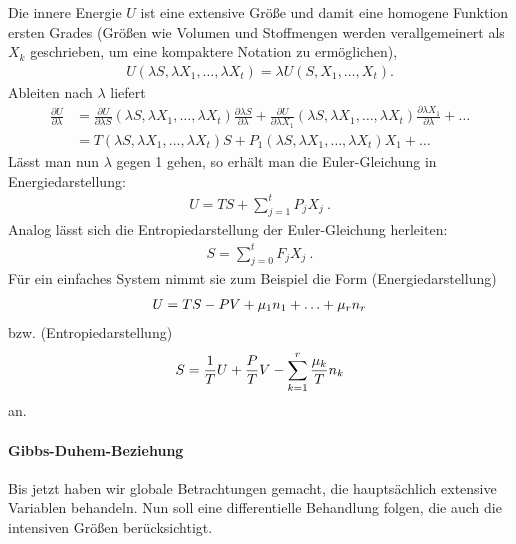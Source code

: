Die innere Energie $U$ ist eine extensive Größe und damit eine homogene Funktion ersten Grades (Größen wie Volumen und Stoffmengen werden verallgemeinert als $X_k$ geschrieben, um eine kompaktere Notation zu ermöglichen),
\begin{align*}
    U(\lambda S,\lambda X_1,\ldots,\lambda X_t) = \lambda U(S,X_1,\ldots,X_t).
\end{align*}
Ableiten nach $\lambda$ liefert
\begin{align*}
    \frac{\partial U}{\partial\lambda} & = \frac{\partial U}{\partial\lambda S}(\lambda S,\lambda X_1,\ldots,\lambda X_t) \frac{\partial\lambda S}{\partial\lambda} + \frac{\partial U}{\partial\lambda X_1}(\lambda S,\lambda X_1,\ldots,\lambda X_t) \frac{\partial\lambda X_1}{\partial\lambda} + \ldots \\
                                       & = T(\lambda S,\lambda X_1,\ldots,\lambda X_t)S + P_1 (\lambda S,\lambda X_1,\ldots,\lambda X_t) X_1 + \ldots                                                                                                                                                       
\end{align*}
Lässt man nun $\lambda$ gegen 1 gehen, so erhält man die Euler-Gleichung in Energiedarstellung:
\begin{align}
    \label{eq:euler_gleichung_energiedarstellung}
    \boxed{U = TS + \sum_{j=1}^t P_j X_j}\:.
\end{align}
Analog lässt sich die Entropiedarstellung der Euler-Gleichung herleiten:
\begin{align}
    \label{eq:euler_gleichung_entropiedarstellung}
    \boxed{S = \sum_{j=0}^t F_j X_j}\:.
\end{align}
Für ein einfaches System nimmt sie zum Beispiel die Form (Energiedarstellung)
\begin{align*}
    U=TS-PV + \mu_1 n_1+\ldots + \mu_r n_r
\end{align*}
bzw. (Entropiedarstellung)
\begin{align*}
    S=\frac{1}{T}U + \frac{P}{T}V - \sum_{k=1}^r \frac{\mu_k}{T}n_k
\end{align*}
an.


\paragraph*{Gibbs-Duhem-Beziehung}

Bis jetzt haben wir globale Betrachtungen gemacht, die hauptsächlich extensive Variablen behandeln. Nun soll eine differentielle Behandlung folgen, die auch die intensiven Größen berücksichtigt.

